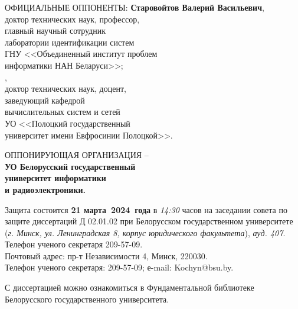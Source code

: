 \documentclass{thesisby}
\begin{document}
\vspace{5mm}
\vspace*{\fill} \noindent \hangindent=53mm
    \begin{tabbing}      
    ОФИЦИАЛЬНЫЕ ОППОНЕНТЫ: \={\bf Старовойтов Валерий Васильевич},\\ \>доктор технических наук, профессор,\\ \>главный научный сотрудник\\ \>лаборатории идентификации систем\\ \>ГНУ <<Объединенный институт проблем\\ \>информатики НАН Беларуси>>; %
    \\ [3mm]
    ,\\ \>доктор технических наук, доцент,\\ \>заведующий кафедрой\\ \>вычислительных систем и сетей\\ \>УО <<Полоцкий государственный\\ \>университет имени Евфросинии Полоцкой>>.
    \end{tabbing}

\vspace{5mm}
\vspace*{\fill} \noindent \hangindent=73mm ОППОНИРУЮЩАЯ
ОРГАНИЗАЦИЯ -- \\ \textbf{УО Белорусский государственный\\ университет информатики\\ и радиоэлектроники.}

\vspace{5mm}
\vspace*{\fill} \noindent Защита состоится \textbf{21 марта~2024~года} в \textit{14:30} часов на заседании совета по защите диссертаций Д 02.01.02 при Белорусском государственном университете (\textit{г. Минск, ул. Ленинградская 8, корпус юридического факультета}), \textit{ауд. 407}. Телефон ученого секретаря 209-57-09.\\
Почтовый адрес: пр-т Независимости 4, Минск, 220030.\\
Телефон ученого секретаря: 209-57-09; е-mail: Kochyn@bsu.by.

\vspace{5mm}
\vspace*{\fill} \noindent
С диссертацией можно ознакомиться в Фундаментальной библиотеке\\ Белорусского государственного университета.
\end{document}
